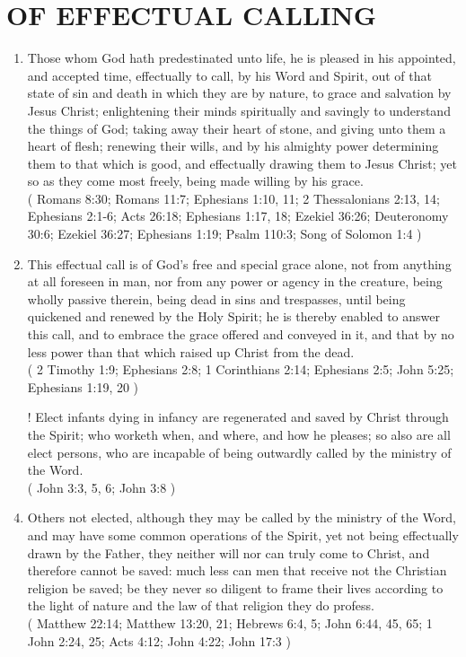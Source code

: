 \documentclass[12pt,a4paper]{book}
\begin{document}
\chapter{OF EFFECTUAL CALLING}
\label{ch-eff-cal}
\begin{enumerate}
\item Those whom God hath predestinated unto life, he is pleased in his appointed, and accepted time, effectually to call, by his Word and Spirit, out of that state of sin and death in which they are by nature, to grace and salvation by Jesus Christ; enlightening their minds spiritually and savingly to understand the things of God; taking away their heart of stone, and giving unto them a heart of flesh; renewing their wills, and by his almighty power determining them to that which is good, and effectually drawing them to Jesus Christ; yet so as they come most freely, being made willing by his grace.\\
( Romans 8:30; Romans 11:7; Ephesians 1:10, 11; 2 Thessalonians 2:13, 14; Ephesians 2:1-6; Acts 26:18; Ephesians 1:17, 18; Ezekiel 36:26; Deuteronomy 30:6; Ezekiel 36:27; Ephesians 1:19; Psalm 110:3; Song of Solomon 1:4 )
\item This effectual call is of God's free and special grace alone, not from anything at all foreseen in man, nor from any power or agency in the creature, being wholly passive therein, being dead in sins and trespasses, until being quickened and renewed by the Holy Spirit; he is thereby enabled to answer this call, and to embrace the grace offered and conveyed in it, and that by no less power than that which raised up Christ from the dead.\\
( 2 Timothy 1:9; Ephesians 2:8; 1 Corinthians 2:14; Ephesians 2:5; John 5:25; Ephesians 1:19, 20 )
\item [!] Elect infants dying in infancy are regenerated and saved by Christ through the Spirit; who worketh when, and where, and how he pleases; so also are all elect persons, who are incapable of being outwardly called by the ministry of the Word.\\
( John 3:3, 5, 6; John 3:8 )
\item Others not elected, although they may be called by the ministry of the Word, and may have some common operations of the Spirit, yet not being effectually drawn by the Father, they neither will nor can truly come to Christ, and therefore cannot be saved: much less can men that receive not the Christian religion be saved; be they never so diligent to frame their lives according to the light of nature and the law of that religion they do profess.\\
( Matthew 22:14; Matthew 13:20, 21; Hebrews 6:4, 5; John 6:44, 45, 65; 1 John 2:24, 25; Acts 4:12; John 4:22; John 17:3 )
\end{enumerate}
\end{document}
